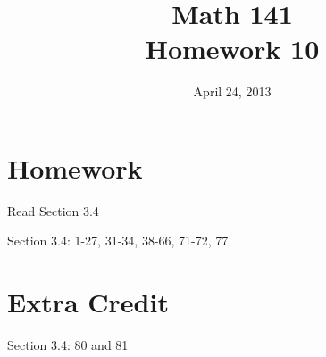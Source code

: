 \documentclass{exam}
\date{April 24, 2013}
\author{}
\title{Math 141 \\ Homework 10}
\begin{document}
\maketitle

\section{Homework}

\begin{itemize*}
  \item Read Section 3.4 
  \item Section 3.4: 1-27, 31-34, 38-66, 71-72, 77
\end{itemize*}

\section{Extra Credit}
Section 3.4: 80 and 81
\end{document}
